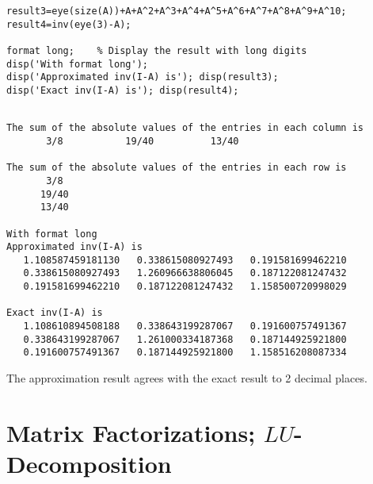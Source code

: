 \begin{sol}
\begin{enumerate}
\begin{verbatim}
result3=eye(size(A))+A+A^2+A^3+A^4+A^5+A^6+A^7+A^8+A^9+A^10;
result4=inv(eye(3)-A);

format long;	% Display the result with long digits
disp('With format long');
disp('Approximated inv(I-A) is'); disp(result3);
disp('Exact inv(I-A) is'); disp(result4);
\end{verbatim}


\begin{outputs}

\begin{verbatim}

The sum of the absolute values of the entries in each column is
       3/8           19/40          13/40    

The sum of the absolute values of the entries in each row is
       3/8     
      19/40    
      13/40    

With format long
Approximated inv(I-A) is
   1.108587459181130   0.338615080927493   0.191581699462210
   0.338615080927493   1.260966638806045   0.187122081247432
   0.191581699462210   0.187122081247432   1.158500720998029

Exact inv(I-A) is
   1.108610894508188   0.338643199287067   0.191600757491367
   0.338643199287067   1.261000334187368   0.187144925921800
   0.191600757491367   0.187144925921800   1.158516208087334
\end{verbatim}

\end{outputs}


\noindent The approximation result agrees with the exact result to 2 decimal places.
\end{enumerate}
\end{sol}


\section{Matrix Factorizations; $LU$-Decomposition}

